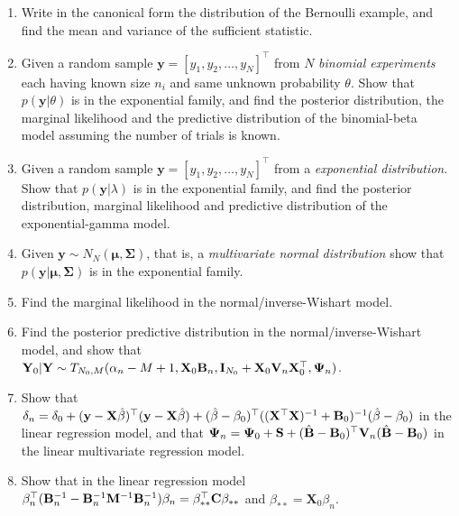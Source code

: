 \begin{enumerate}
	\item Write in the canonical form the distribution of the Bernoulli example, and find the mean and variance of the sufficient statistic.
	
	\item Given a random sample $\mathbf{y}=[y_1,y_2,\dots,y_N]^{\top}$ from $N$ \textit{binomial experiments} each having known size $n_i$ and same unknown probability $\theta$. Show that $p(\mathbf{y}|\theta)$ is in the exponential family, and find the posterior distribution, the marginal likelihood and the predictive distribution of the binomial-beta model assuming the number of trials is known.
	
	\item Given a random sample $\mathbf{y}=[y_1,y_2,\dots,y_N]^{\top}$ from a \textit{exponential distribution}. Show that $p(\mathbf{y}|\lambda)$ is in the exponential family, and find the posterior distribution, marginal likelihood and predictive distribution of the exponential-gamma model.
	
	\item Given $\mathbf{y}\sim N_N(\mathbf{\mu},\mathbf{\Sigma})$, that is, a \textit{multivariate normal distribution} show that $p(\mathbf{y}|\mathbf{\mu},\mathbf{\Sigma})$ is in the exponential family.
	
	\item Find the marginal likelihood in the normal/inverse-Wishart model.
	
	\item Find the posterior predictive distribution in the normal/inverse-Wishart model, and show that ${\bf{Y}}_0|{\bf{Y}}\sim T_{N_0,M}(\alpha_n-M+1,{\bf{X}}_0{\bf{B}}_n,{\bf{I}}_{N_0}+{\bf{X}}_0{\bf{V}}_n{\bf{X}}_0^{\top},{\bf{\Psi}}_n)$.
	
	\item Show that $\delta_n=\delta_0+({\bf{y}}-{\bf{X}}\hat{\beta})^{\top}({\bf{y}}-{\bf{X}}\hat{\beta})+(\hat{\beta}-\beta_0)^{\top}(({\bf{X}}^{\top}{\bf{X}})^{-1}+{\bf{B}}_0)^{-1}(\hat{\beta}-\beta_0)$ in the linear regression model, and that ${\bf{\Psi}}_{n}={\bf{\Psi}}_{0}+{\bf{S}}+(\hat{\bf{B}}-{\bf{B}}_{0})^{\top}{\bf{V}}_{n}(\hat{\bf{B}}-{\bf{B}}_{0})$ in the linear multivariate regression model. 
			
	\item Show that in the linear regression model $\beta_n^{\top}({\bf{B}}_n^{-1}-{\bf{B}}_n^{-1}{\bf{M}}^{-1}{\bf{B}}_n^{-1})\beta_n={\bf{\beta}}_{**}^{\top}{\bf{C}}{\bf{\beta}}_{**}$ and $\beta_{**}={\mathbf{X}}_0\beta_n$.
	

\end{enumerate}
